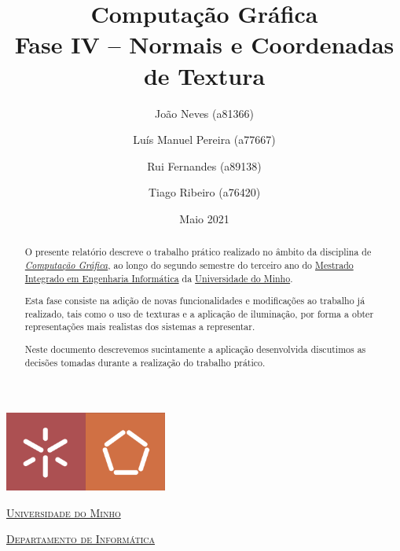 \documentclass[a4paper, 11pt]{article}
\title{Computação Gráfica \\ [0.8em] \smaller{} Fase IV -- Normais e Coordenadas de Textura}
\author{João Neves (a81366) \and Luís Manuel Pereira (a77667) \and Rui Fernandes (a89138)
\and Tiago Ribeiro (a76420)}
\date{Maio 2021}
\begin{document}
\begin{titlepage}
    \begin{center}
        \begin{minipage}{.75\linewidth}
            \centering
            \includegraphics[width=0.4\textwidth]{img/EEUM.png}\par\vspace{1cm}
            \vspace{1.5cm}
            \href{https://www.uminho.pt/PT}{\scshape\LARGE Universidade do Minho} \par
            \vspace{1cm}
            \href{https://www.di.uminho.pt/}{\scshape\Large Departamento de Informática} \par
            \vspace{1.5cm}
            \maketitle
        \end{minipage}
    \end{center}
    \vspace{2cm}
    \thispagestyle{empty}
    \clearpage
\end{titlepage}


\begin{abstract}
O presente relatório descreve o trabalho prático realizado no âmbito da disciplina de 
\href{https://miei.di.uminho.pt/plano_estudos.html#computa_o_gr_fica}{\emph{Computação 
Gráfica}}, ao longo do segundo semestre
do terceiro ano do \href{http://miei.di.uminho.pt}{Mestrado Integrado em Engenharia Informática} 
da \href{https://www.uminho.pt}{Universidade do Minho}.

Esta fase consiste na adição de novas funcionalidades e modificações ao trabalho já realizado, 
tais como o uso de texturas e a aplicação de iluminação, por forma a obter representações 
mais realistas dos sistemas a representar.

Neste documento descrevemos sucintamente a aplicação desenvolvida discutimos as decisões tomadas 
durante a realização do trabalho prático.
\end{abstract}
\end{document}
